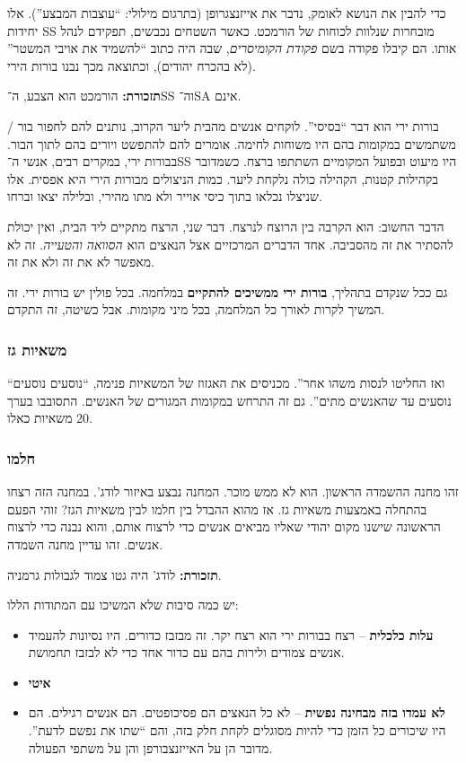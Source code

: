 \documentclass[a4paper]{book}
\begin{document}
	כדי להבין את הנושא לאומק, נדבר את אייזנצגרופן (בתרגום מילולי: ``עוצבות המבצע''). אלו יחידות SS מובחרות שנלוות לכוחות של הורמכט. כאשר השטחים נכבשים, תפקידם לנהל אותו. הם קיבלו פקודה בשם \textit{פקודת הקומיסרים}, שבה היה כתוב ``להשמיד את אויבי המשטר'' (לא בהכרח יהודים), וכתוצאה מכך נבנו בורות הירי. 
	
	\textbf{תזכורת: }הורמכט הוא הצבע, ה־SS וה־SA אינם. 
	
	בורות ירי הוא דבר ``בסיסי''. לוקחים אנשים מהבית ליער הקרוב, נותנים להם לחפור בור / משתמשים במקומות בהם היו משוחות לחימה. אומרים להם להתפשט ויורים בהם לתוך הבור. בבורות ירי, במקרים רבים, אנשי ה־SS היו מיעוט ובפועל המקומיים השתתפו ברצח. כשמדובר בקהילות קטנות, הקהילה כולה נלקחת ליער. כמות הניצולים מבורות הירי היא אפסית. אלו שניצלו נכלאו בתוך כיסי אוייר ולא מתו מהירי, ובלילה יצאו וברחו. 
	
	הדבר החשוב: הוא הקרבה בין הרוצח לנרצח. דבר שני, הרצח מתקיים ליד הבית, ואין יכולת להסתיר את זה מהסביבה. אחד הדברים המרכזיים אצל הנאצים הוא \textit{הסוואה והטעייה}. זה לא מאפשר לא את זה ולא את זה. 
	
	גם ככל שנקדם בתהליך, \textbf{בורות ירי ממשיכים להתקיים} במלחמה. בכל פולין יש בורות ירי. זה המשיך לקרות לאורך כל המלחמה, בכל מיני מקומות. אבל כשיטה, זה התקדם. 
	
	\subsubsection{משאיות גז}
	``ואז החליטו לנסות משהו אחר''. מכניסים את האגזוז של המשאיות פנימה, ``נוסעים נוסעים נוסעים עד שהאנשים מתים''. גם זה התרחש במקומות המגורים של האנשים. התסובבו בערך 20 משאיות כאלו. 
	
	\subsubsection{חלמו}
	זהו מחנה ההשמדה הראשון. הוא לא ממש מוכר. המחנה נבצע באיזור לודג'. במחנה הזה רצחו בהתחלה באמצעות משאיות גז. אז מהוא ההבדל בין חלמו לבין משאיות הגז? זוהי הפעם הראשונה שישנו מקום יהודי שאליו מביאים אנשים כדי לרצוח אותם, והוא נבנה כדי לרצוח אנשים. זהו עדיין מחנה השמדה. 
	
	\textbf{תזכורת: }לודג' היה גטו צמוד לגבולות גרמניה. 
	
	יש כמה סיבות שלא המשיכו עם המתודות הללו: 
	\begin{itemize}
		\item \textbf{עלות כלכלית} – רצח בבורות ירי הוא רצח יקר. זה מבזבז כדורים. היו נסיונות להעמיד אנשים צמודים ולירות בהם עם כדור אחד כדי לא לבזבז תחמושת. 
		\item \textbf{איטי}
		\item \textbf{לא עמדו בזה מבחינה נפשית} – לא כל הנאצים הם פסיכופטים. הם אנשים רגילים. הם היו שיכורים כל הזמן כדי להיות מסוגלים לקחת חלק בזה, והם ``שתו את נפשם לדעת''. מדובר הן על האייזנצבורפן והן על משתפי הפעולה. 
	\end{itemize}
	
\end{document}
